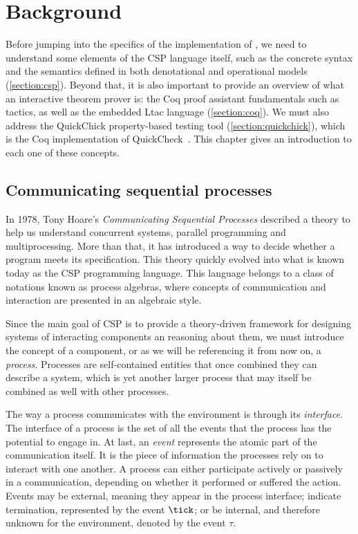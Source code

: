 \chapter{Background}
\label{chapter:background}

Before jumping into the specifics of the implementation of \CSPcoq{}, we need to understand some elements of the CSP language itself, such as the concrete syntax and the semantics defined in both denotational and operational models (\autoref{section:csp}). Beyond that, it is also important to provide an overview of what an interactive theorem prover is: the Coq proof assistant fundamentals such as tactics, as well as the embedded Ltac language (\autoref{section:coq}). We must also address the QuickChick property-based testing tool (\autoref{section:quickchick}), which is the Coq implementation of QuickCheck~\cite{hughes:quickcheck2000}. This chapter gives an introduction to each one of these concepts.

\section{Communicating sequential processes}
\label{section:csp}

In 1978, Tony Hoare's \emph{Communicating Sequential Processes} \cite{hoare:csp} described a theory to help us understand concurrent systems, parallel programming and multiprocessing. More than that, it has introduced a way to decide whether a program meets its specification. This theory quickly evolved into what is known today as the CSP programming language. This language belongs to a class of notations known as process algebras, where concepts of communication and interaction are presented in an algebraic style.

Since the main goal of CSP is to provide a theory-driven framework for designing systems of interacting components an reasoning about them, we must introduce the concept of a component, or as we will be referencing it from now on, a \emph{process}. Processes are self-contained entities that once combined they can describe a system, which is yet another larger process that may itself be combined as well with other processes.

The way a process communicates with the environment is through its \emph{interface}. The interface of a process is the set of all the events that the process has the potential to engage in. At last, an \emph{event} represents the atomic part of the communication itself. It is the piece of information the processes rely on to interact with one another. A process can either participate actively or passively in a communication, depending on whether it performed or suffered the action. Events may be external, meaning they appear in the process interface; indicate termination, represented by the event $ \tick $; or be internal, and therefore unknown for the environment, denoted by the event $ \tau $.

